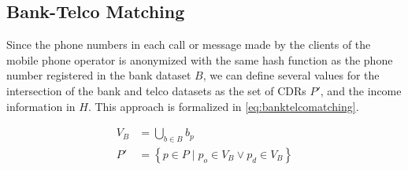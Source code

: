 \subsection{Bank-Telco Matching}

Since the phone numbers in each call or message made by the clients of the mobile phone operator is anonymized with the same hash function as the phone number registered in the bank dataset $B$, we can define several values for the intersection of the bank and telco datasets as the set of CDRs $P'$, and the income information in $H$. This approach is formalized in \cref{eq:banktelcomatching}.

\begin{equation}
\label{eq:banktelcomatching}
\begin{aligned}
	V_B &= \bigcup_{b \in B} b_p \\
	P' &= \left\{ p \in P \mid p_o \in V_B \lor p_d \in V_B \right\}
\end{aligned}
\end{equation}

